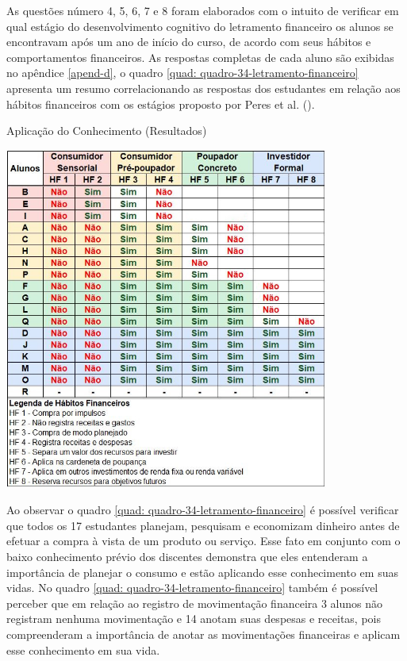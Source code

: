 As questões número 4, 5, 6, 7 e 8 foram elaborados com o intuito de verificar em qual estágio do desenvolvimento cognitivo do letramento financeiro os alunos se encontravam após um ano de início do curso, de acordo com seus hábitos e comportamentos financeiros. As respostas completas de cada aluno são exibidas no apêndice \ref{apend-d}, o quadro \ref{quad: quadro-34-letramento-financeiro} apresenta um resumo correlacionando as respostas dos estudantes em relação aos hábitos financeiros com os estágios proposto por Peres et al. (\citeyear{peres2019}).

\graphicspath{{quadros/}}
\begin{quadro}[!ht]
\centering
\begin{minipage}{0.80\textwidth}
\caption{Aplicação do Conhecimento (Resultados)}
\centering
\includegraphics[width=0.80\textwidth]{quadro-34-letramento-financeiro}
\label{quad: quadro-34-letramento-financeiro}
\end{minipage}
\end{quadro}

\newpage
Ao observar o quadro \ref{quad: quadro-34-letramento-financeiro} é possível verificar que todos os 17 estudantes planejam, pesquisam e economizam dinheiro antes de efetuar a compra à vista de um produto ou serviço. Esse fato em conjunto com o baixo conhecimento prévio dos discentes demonstra que eles entenderam a importância de planejar o consumo e estão aplicando esse conhecimento em suas vidas. No quadro \ref{quad: quadro-34-letramento-financeiro} também é possível perceber que em relação ao registro de movimentação financeira 3 alunos não registram nenhuma movimentação e 14 anotam suas despesas e receitas, pois compreenderam a importância de anotar as movimentações financeiras e aplicam esse conhecimento em sua vida.

